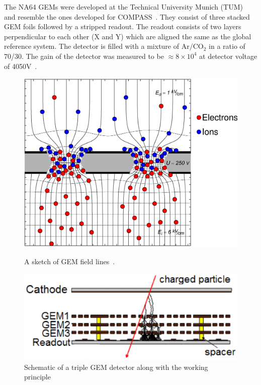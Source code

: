  The NA64 GEMs were developed at the Technical University Munich (TUM)~\cite{Baust:2008} and resemble the ones developed for COMPASS~\cite{Ketzer:2001dt}. They consist of three stacked GEM foils followed by a stripped readout. The readout consists of two layers perpendicular to each other (X and Y) which are aligned the same as the global reference system. The detector is filled with a mixture of $\mathrm{Ar/CO_2}$ in a ratio of 70/30. The gain of the detector was measured to be $\approx 8 \times 10^4 $ at detector voltage of 4050V~\cite{hosgen:2017}.

 \begin{figure}[t!]
 \centering
   \begin{minipage}[t]{.45\textwidth}
     \centering
     \includegraphics[width=\linewidth]{thesis_figures/GEM_field.png}

     \caption{A sketch of GEM field lines~\cite{GEM_field}.}
     \label{fig:GEM_field}
   \end{minipage}
   \hfill
   \begin{minipage}[t]{.45\textwidth}
     \centering
     \includegraphics[width=\linewidth]{thesis_figures/GEM_process.png}
     \caption{Schematic of a triple GEM detector along with the working principle~\cite{article_GEM_pic}}
     \label{fig:Triple_GEM}
   \end{minipage}
 \end{figure}

